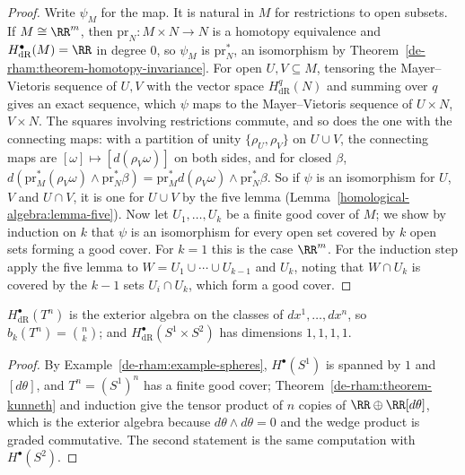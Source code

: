 \begin{proof}
Write $\psi_M$ for the map. It is natural in $M$ for restrictions to open subsets. If $M \cong \RR^m$, then $\mathrm{pr}_N \colon M \times N \to N$ is a homotopy equivalence and $H^\bullet_{\mathrm{dR}}(M) = \RR$ in degree $0$, so $\psi_M$ is
$\mathrm{pr}_N^*$, an isomorphism by Theorem~\ref{de-rham:theorem-homotopy-invariance}. For open $U, V \subseteq M$, tensoring the Mayer--Vietoris sequence of $U, V$ with the vector space $H^q_{\mathrm{dR}}(N)$ and summing over $q$ gives an
exact sequence, which $\psi$ maps to the Mayer--Vietoris sequence of $U \times N$, $V \times N$. The squares involving restrictions commute, and so does the one with the connecting maps: with a partition of unity $\{\rho_U, \rho_V\}$ on
$U \cup V$, the connecting maps are $[\omega] \mapsto [d(\rho_V\omega)]$ on both sides, and for closed $\beta$, $d(\mathrm{pr}_M^*(\rho_V\omega) \wedge \mathrm{pr}_N^*\beta) = \mathrm{pr}_M^*d(\rho_V\omega) \wedge \mathrm{pr}_N^*\beta$. So if $\psi$ is an isomorphism for $U$, $V$ and $U \cap V$, it is one for $U \cup V$
by the five lemma (Lemma~\ref{homological-algebra:lemma-five}). Now let $U_1, \ldots, U_k$ be a finite good cover of $M$; we show by induction on $k$ that $\psi$ is an isomorphism for every open set covered by $k$ open sets forming a good
cover. For $k = 1$ this is the case $\RR^m$. For the induction step apply the five lemma to $W = U_1 \cup \cdots \cup U_{k-1}$ and $U_k$, noting that $W \cap U_k$ is covered by the $k - 1$ sets $U_i \cap U_k$, which form a good cover.
\end{proof}

\begin{corollary}\label{de-rham:corollary-torus}
$H^\bullet_{\mathrm{dR}}(T^n)$ is the exterior algebra on the classes of $dx^1, \ldots, dx^n$, so $b_k(T^n) = \binom nk$; and $H^\bullet_{\mathrm{dR}}(S^1 \times S^2)$ has dimensions $1, 1, 1, 1$.
\end{corollary}

\begin{proof}
By Example~\ref{de-rham:example-spheres}, $H^\bullet(S^1)$ is spanned by $1$ and $[d\theta]$, and $T^n = (S^1)^n$ has a finite good cover; Theorem~\ref{de-rham:theorem-kunneth} and induction give the tensor product of $n$ copies of
$\RR \oplus \RR[d\theta]$, which is the exterior algebra because $d\theta \wedge d\theta = 0$ and the wedge product is graded commutative. The second statement is the same computation with $H^\bullet(S^2)$.
\end{proof}

